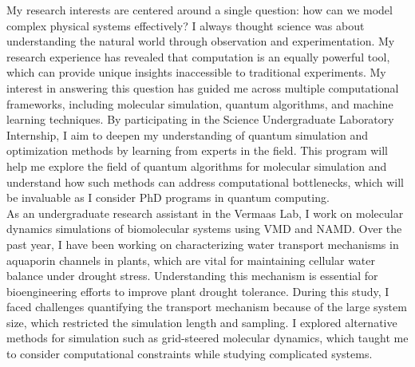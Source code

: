 \documentclass{article}
\begin{document}
My research interests are centered around a single question: how can we model complex physical systems effectively? 
I always thought science was about understanding the natural world through observation and experimentation. 
My research experience has revealed that computation is an equally powerful tool, which can provide unique insights inaccessible to traditional experiments.
My interest in answering this question has guided me across multiple computational frameworks, including molecular simulation, 
quantum algorithms, and machine learning techniques. By participating in the Science Undergraduate Laboratory Internship, I aim to deepen my understanding of 
quantum simulation and optimization methods by learning from experts in the field. This program will help me explore the field of 
quantum algorithms for molecular simulation and understand how such methods can address computational bottlenecks, 
which will be invaluable as I consider PhD programs in quantum computing.
\\

As an undergraduate research assistant in the Vermaas Lab, I work on molecular dynamics simulations of biomolecular systems 
using VMD and NAMD. Over the past year, I have been working on characterizing water transport mechanisms in aquaporin channels in plants, which are vital for maintaining cellular water balance 
under drought stress. Understanding this mechanism is essential for bioengineering efforts to improve plant drought 
tolerance. During this study, I faced challenges quantifying the transport mechanism because of the large system size, 
which restricted the simulation length and sampling. I explored alternative methods 
for simulation such as grid-steered molecular dynamics, which taught me to consider computational constraints while studying 
complicated systems.
\\
\end{document}
